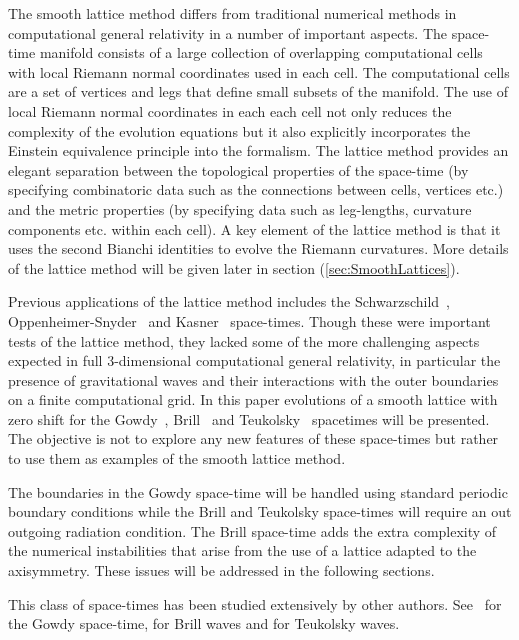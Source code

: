 \documentclass[a4paper,12pt]{article}
\numberwithin{equation}{section}
\begin{document}
The smooth lattice method differs from traditional numerical methods in computational
general relativity in a number of important aspects. The space-time manifold consists of a
large collection of overlapping computational cells with local Riemann normal coordinates
used in each cell. The computational cells are a set of vertices and legs that define small
subsets of the manifold. The use of local Riemann normal coordinates in each each cell not
only reduces the complexity of the evolution equations but it also explicitly incorporates
the Einstein equivalence principle into the formalism. The lattice method provides an
elegant separation between the topological properties of the space-time (by specifying
combinatoric data such as the connections between cells, vertices etc.) and the metric
properties (by specifying data such as leg-lengths, curvature components etc. within each
cell). A key element of the lattice method is that it uses the second Bianchi identities to
evolve the Riemann curvatures. More details of the lattice method will be given later in
section (\ref{sec:SmoothLattices}).

Previous applications of the lattice method includes the
Schwarzschild~\cite{brewin:2010-02}, Oppenheimer-Snyder~\cite{brewin:2009-05} and
Kasner~\cite{brewin:2014-01} space-times. Though these were important tests of the lattice
method, they lacked some of the more challenging aspects expected in full 3-dimensional
computational general relativity, in particular the presence of gravitational waves and
their interactions with the outer boundaries on a finite computational grid. In this paper
evolutions of a smooth lattice with zero shift for the Gowdy~\cite{gowdy:1971-01},
Brill~\cite{brill:1959-01} and Teukolsky~\cite{teukolsky:1982-01} spacetimes will be
presented. The objective is not to explore any new features of these space-times but rather
to use them as examples of the smooth lattice method.

The boundaries in the Gowdy space-time will be handled using standard periodic boundary
conditions while the Brill and Teukolsky space-times will require an out outgoing radiation
condition. The Brill space-time adds the extra complexity of the numerical instabilities
that arise from the use of a lattice adapted to the axisymmetry. These issues will be
addressed in the following sections.

This class of space-times has been studied extensively by other authors.
See~\cite{berger:1993-01,hern:1998-01,garfinkle:2004-01} for the Gowdy space-time,
\cite{eppley:1979-01,Choptuik:2003-01,alcubierre:2000-04,miyama:1981-01} for Brill waves and
\cite{baumgarte:1998-01,abrahams:1998-01} for Teukolsky waves.
\end{document}
